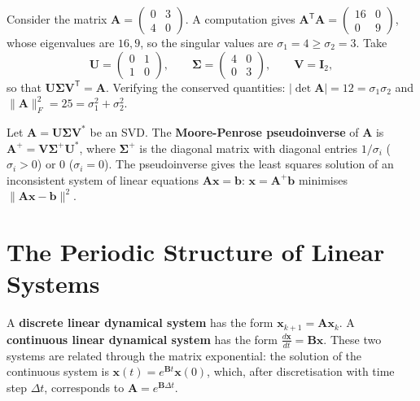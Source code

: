 \begin{example}\label{ch5_example_svd_2x2}
Consider the matrix $\mathbf{A} = \begin{pmatrix} 0 & 3 \\ 4 & 0 \end{pmatrix}$. A computation gives $\mathbf{A}^{\mathsf T}\mathbf{A} = \begin{pmatrix} 16 & 0 \\ 0 & 9 \end{pmatrix}$, whose eigenvalues are $16, 9$, so the singular values are $\sigma_1 = 4 \ge \sigma_2 = 3$. Take
\[
\mathbf{U} = \begin{pmatrix} 0 & 1 \\ 1 & 0 \end{pmatrix}, \qquad \boldsymbol{\Sigma} = \begin{pmatrix} 4 & 0 \\ 0 & 3 \end{pmatrix}, \qquad \mathbf{V} = \mathbf{I}_2,
\]
so that $\mathbf{U}\boldsymbol{\Sigma}\mathbf{V}^{\mathsf T} = \mathbf{A}$. Verifying the conserved quantities: $|\det\mathbf{A}| = 12 = \sigma_1\sigma_2$ and $\|\mathbf{A}\|_F^2 = 25 = \sigma_1^2 + \sigma_2^2$.
\end{example}

\begin{definition}\label{def:pseudoinverse}
Let $\mathbf{A} = \mathbf{U} \boldsymbol{\Sigma} \mathbf{V}^*$ be an SVD. The \textbf{Moore-Penrose pseudoinverse} of $\mathbf{A}$ is $\mathbf{A}^+ = \mathbf{V} \boldsymbol{\Sigma}^+ \mathbf{U}^*$, where $\boldsymbol{\Sigma}^+$ is the diagonal matrix with diagonal entries $1/\sigma_i$ ($\sigma_i > 0$) or $0$ ($\sigma_i = 0$). The pseudoinverse gives the least squares solution of an inconsistent system of linear equations $\mathbf{A}\mathbf{x} = \mathbf{b}$: $\mathbf{x} = \mathbf{A}^+ \mathbf{b}$ minimises $\|\mathbf{A}\mathbf{x} - \mathbf{b}\|^2$.
\end{definition}

\section{\texorpdfstring{The Periodic Structure of Linear Systems}{The Periodic Structure of Linear Systems}}

\begin{definition}\label{def:linear_dynamical_system}
A \textbf{discrete linear dynamical system} has the form $\mathbf{x}_{k+1} = \mathbf{A} \mathbf{x}_k$. A \textbf{continuous linear dynamical system} has the form $\frac{d\mathbf{x}}{dt} = \mathbf{B} \mathbf{x}$. These two systems are related through the matrix exponential: the solution of the continuous system is $\mathbf{x}(t) = e^{\mathbf{B}t} \mathbf{x}(0)$, which, after discretisation with time step $\Delta t$, corresponds to $\mathbf{A} = e^{\mathbf{B}\Delta t}$.
\end{definition}

